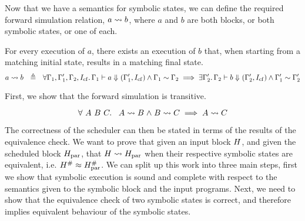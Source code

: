 {Now that we have a semantics for symbolic states, we can define the required
forward simulation relation, $a \mathrel{\leadsto} b$, where $a$ and $b$ are both blocks, or
both symbolic states, or one of each.


\begin{definition}
  For every execution of $a$, there exists an execution of $b$ that,
  when starting from a matching initial state, results in a matching final state.
  \begin{equation*}
      a \curly b\ \ \defeq\ \ \forall\context_1, \context_1',
        \context_2, \cfinstr\ldotp
        \sem{}{\context_1}{a}{(\context_1', \cfinstr)} \land
        \context_1 \sim \context_2 \implies
      \exists\context_2'\ldotp \sem{}{\context_2}{b}{(\context_2', \cfinstr)}
 \land \context_1' \sim \context_2'\\
  \end{equation*}
\end{definition}

First, we show that the forward simulation is transitive.

\begin{lemma}\label{thm:transitivity}
  \begin{equation}
    \label{eq:1}
    \forall\ A\ B\ C\ldotp\ \ A \mathrel{\leadsto} B \mathrel{\land} B \mathrel{\leadsto} C \implies A \mathrel{\leadsto} C
  \end{equation}
\end{lemma}

The correctness of the scheduler can then be stated in terms of the results of
the equivalence check.  We want to prove that given an input block $H$, and
given the scheduled block $H_\text{par}$, that $H \mathrel{\leadsto} H_\text{par}$ when their
respective symbolic states are equivalent,
i.e. $H^{\#} \approx H_\text{par}^{\#}$.  We can split up this
work into three main steps, first we show that symbolic execution is sound and
complete with respect to the semantics given to the symbolic block and the input
programs.  Next, we need to show that the equivalence check of two symbolic
states is correct, and therefore implies equivalent behaviour of the symbolic
states.

}
